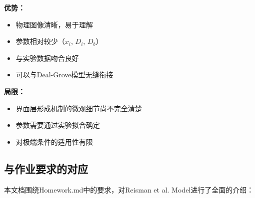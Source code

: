 \documentclass[UTF8,12pt,a4paper]{ctexart}
\begin{document}
\textbf{优势：}
\begin{itemize}
    \item 物理图像清晰，易于理解
    \item 参数相对较少（$x_i$, $D_i$, $D_b$）
    \item 与实验数据吻合良好
    \item 可以与Deal-Grove模型无缝衔接
\end{itemize}

\textbf{局限：}
\begin{itemize}
    \item 界面层形成机制的微观细节尚不完全清楚
    \item 参数需要通过实验拟合确定
    \item 对极端条件的适用性有限
\end{itemize}

\subsection{与作业要求的对应}

本文档围绕Homework.md中的要求，对Reisman et al. Model进行了全面的介绍：
\end{document}
